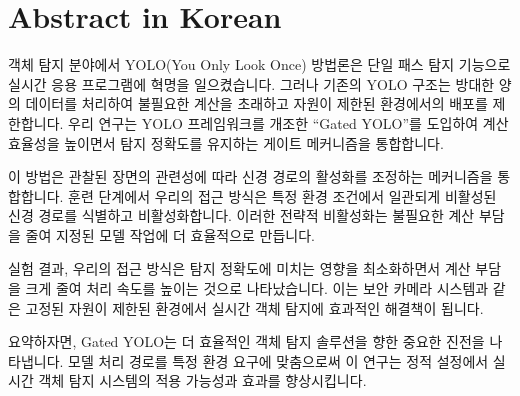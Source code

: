 \section*{Abstract in Korean} 						%

객체 탐지 분야에서 YOLO(You Only Look Once) 방법론은 단일 패스 탐지 기능으로 실시간 응용 프로그램에 혁명을 일으켰습니다. 그러나 기존의 YOLO 구조는 방대한 양의 데이터를 처리하여 불필요한 계산을 초래하고 자원이 제한된 환경에서의 배포를 제한합니다. 우리 연구는 YOLO 프레임워크를 개조한 ``Gated YOLO''를 도입하여 계산 효율성을 높이면서 탐지 정확도를 유지하는 게이트 메커니즘을 통합합니다.

이 방법은 관찰된 장면의 관련성에 따라 신경 경로의 활성화를 조정하는 메커니즘을 통합합니다. 훈련 단계에서 우리의 접근 방식은 특정 환경 조건에서 일관되게 비활성된 신경 경로를 식별하고 비활성화합니다. 이러한 전략적 비활성화는 불필요한 계산 부담을 줄여 지정된 모델 작업에 더 효율적으로 만듭니다.

실험 결과, 우리의 접근 방식은 탐지 정확도에 미치는 영향을 최소화하면서 계산 부담을 크게 줄여 처리 속도를 높이는 것으로 나타났습니다. 이는 보안 카메라 시스템과 같은 고정된 자원이 제한된 환경에서 실시간 객체 탐지에 효과적인 해결책이 됩니다.

요약하자면, Gated YOLO는 더 효율적인 객체 탐지 솔루션을 향한 중요한 진전을 나타냅니다. 모델 처리 경로를 특정 환경 요구에 맞춤으로써 이 연구는 정적 설정에서 실시간 객체 탐지 시스템의 적용 가능성과 효과를 향상시킵니다.

\clearpage